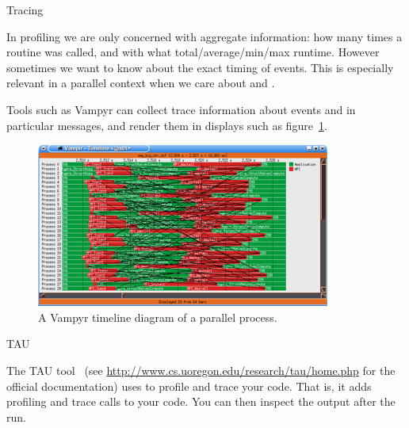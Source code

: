  {Tracing}

In profiling we are only concerned with aggregate information: how
many times a routine was called, and with what total/average/min/max
runtime. However sometimes we want to know about the exact timing of
events. This is especially relevant in a parallel context when we care
about  and .

Tools such as Vampyr can collect trace information about
events and in particular messages, and render them in displays such as
figure~\ref{fig:vampyr}.
\begin{figure}[ht]
  \includegraphics{graphics-public/vampyrtrace}
  \caption{A Vampyr timeline diagram of a parallel process.}
  \label{fig:vampyr}
\end{figure}

 {TAU}
\label{sec:tau}

The TAU tool~\cite{TAU:ijhpca}
(see \url{http://www.cs.uoregon.edu/research/tau/home.php} for the official documentation)
uses  to profile and trace your code. That is, it adds 
profiling and trace calls to your code. You can then inspect
the output after the run.

